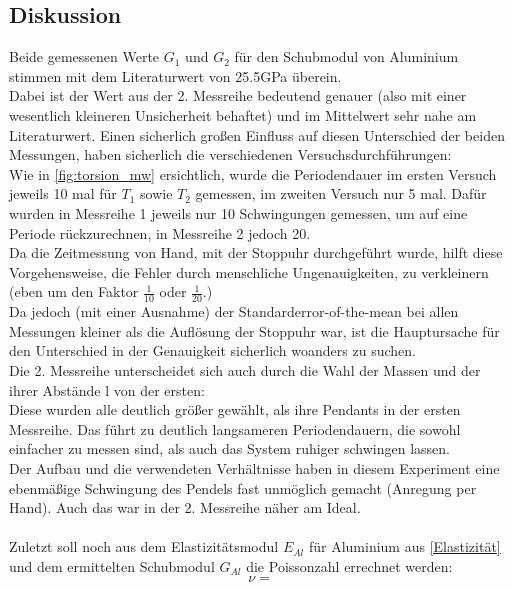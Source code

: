 \documentclass[12pt,a4paper]{article}
\begin{document}
\begin{multicols}{2}
\subsection{Diskussion}
Beide gemessenen Werte $G_1$ und $G_2$ für den Schubmodul von Aluminium stimmen mit dem Literaturwert von 25.5GPa überein.\\
Dabei ist der Wert aus der 2. Messreihe bedeutend genauer (also mit einer wesentlich kleineren Unsicherheit behaftet) und im Mittelwert sehr nahe am Literaturwert.
Einen sicherlich großen Einfluss auf diesen Unterschied der beiden Messungen, haben sicherlich die verschiedenen Versuchsdurchführungen:\\
Wie in \ref{fig:torsion_mw} ersichtlich, wurde die Periodendauer im ersten Versuch jeweils 10 mal für $T_1$ sowie $T_2$ gemessen, im zweiten Versuch nur 5 mal. Dafür wurden in Messreihe 1 jeweils nur 10 Schwingungen gemessen, um auf eine Periode rückzurechnen, in Messreihe 2 jedoch 20.\\
Da die Zeitmessung von Hand, mit der Stoppuhr durchgeführt wurde, hilft diese Vorgehensweise, die Fehler durch menschliche Ungenauigkeiten, zu verkleinern (eben um den Faktor $\frac{1}{10}$ oder $\frac{1}{20}$.)\\
Da jedoch (mit einer Ausnahme) der Standarderror-of-the-mean bei allen Messungen kleiner als die Auflösung der Stoppuhr war, ist die Hauptursache für den Unterschied in der Genauigkeit sicherlich woanders zu suchen.\\
Die 2. Messreihe unterscheidet sich auch durch die Wahl der Massen und der ihrer Abstände l von der ersten:\\
Diese wurden alle deutlich größer gewählt, als ihre Pendants in der ersten Messreihe. Das führt zu deutlich langsameren Periodendauern, die sowohl einfacher zu messen sind, als auch das System ruhiger schwingen lassen.\\
Der Aufbau und die verwendeten Verhältnisse haben in diesem Experiment eine ebenmäßige Schwingung des Pendels fast unmöglich gemacht (Anregung per Hand). Auch das war in der 2. Messreihe näher am Ideal.\\
\\
Zuletzt soll noch aus dem Elastizitätsmodul $E_{Al}$ für Aluminium aus \ref{Elastizität} und dem ermittelten Schubmodul $G_{Al}$ die Poissonzahl errechnet werden:\\

$$\nu = $$




\end{multicols}
\end{document}

